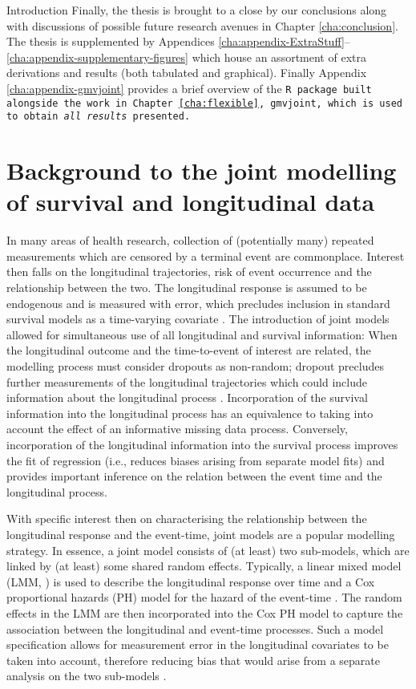 \begin{chapter}{\label{cha:intro}Introduction}
  Finally, the thesis is brought to a close by our conclusions along with discussions of possible future research avenues in Chapter \ref{cha:conclusion}. The thesis is supplemented by Appendices \ref{cha:appendix-ExtraStuff}--\ref{cha:appendix-supplementary-figures} which house an assortment of extra derivations and results (both tabulated and graphical). Finally Appendix \ref{cha:appendix-gmvjoint} provides a brief overview of the \tt{R} package built alongside the work in Chapter \ref{cha:flexible}, \tt{gmvjoint}, which is used to obtain \textit{all results} presented.
  
  \section{\label{sec:jointintro}Background to the joint modelling of survival and longitudinal data}
  In many areas of health research, collection of (potentially many) repeated measurements which are censored by a terminal event are commonplace. Interest then falls on the longitudinal trajectories, risk of event occurrence and the relationship between the two. The longitudinal response is assumed to be endogenous and is measured with error, which precludes inclusion in standard survival models as a time-varying covariate \citep{Prentice1982, Kalbfleisch2002}. The introduction of joint models allowed for simultaneous use of all longitudinal and survival information: When the longitudinal outcome and the time-to-event of interest are related, the modelling process must consider dropouts as non-random; dropout precludes further measurements of the longitudinal trajectories which could include information about the longitudinal process \citep{Martins2022}. Incorporation of the survival information into the longitudinal process has an equivalence to taking into account the effect of an informative missing data process. Conversely, incorporation of the longitudinal information into the survival process improves the fit of regression (i.e., reduces biases arising from separate model fits) and provides important inference on the relation between the event time and the longitudinal process.
  
  With specific interest then on characterising the relationship between the longitudinal response and the event-time, joint models are a popular modelling strategy. In essence, a joint model consists of (at least) two sub-models, which are linked by (at least) some shared random effects. Typically, a linear mixed model (LMM, \citet{LairdWare1982}) is used to describe the longitudinal response over time and a Cox proportional hazards (PH) model for the hazard of the event-time \citep{Cox1972}. The random effects in the LMM are then incorporated into the Cox PH model to capture the association between the longitudinal and event-time processes. Such a model specification allows for measurement error in the longitudinal covariates to be taken into account, therefore reducing bias that would arise from a separate analysis on the two sub-models \citep{Ibrahim2010}.
  

\end{chapter}
